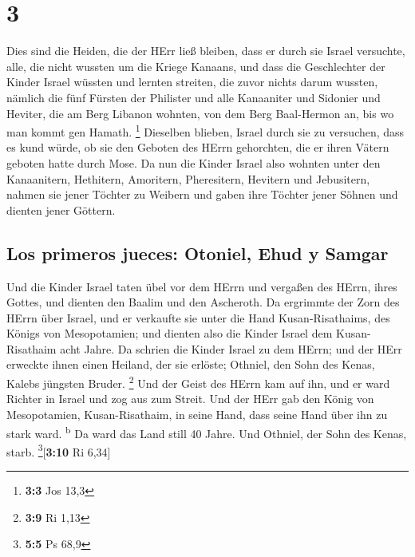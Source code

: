\hypertarget{section-2}{%
\section{3}\label{section-2}}

 Dies sind die Heiden, die der HErr ließ bleiben, dass er
durch sie Israel versuchte, alle, die nicht wussten um die Kriege
Kanaans,  und dass die Geschlechter der Kinder Israel
wüssten und lernten streiten, die zuvor nichts darum wussten,
 nämlich die fünf Fürsten der Philister und alle
Kanaaniter und Sidonier und Heviter, die am Berg Libanon wohnten, von
dem Berg Baal-Hermon an, bis wo man kommt gen Hamath. \footnote{\textbf{3:3}
  Jos 13,3}  Dieselben blieben, Israel durch sie zu
versuchen, dass es kund würde, ob sie den Geboten des HErrn gehorchten,
die er ihren Vätern geboten hatte durch Mose.  Da nun die
Kinder Israel also wohnten unter den Kanaanitern, Hethitern, Amoritern,
Pheresitern, Hevitern und Jebusitern,  nahmen sie jener
Töchter zu Weibern und gaben ihre Töchter jener Söhnen und dienten jener
Göttern.

\hypertarget{los-primeros-jueces-otoniel-ehud-y-samgar}{%
\subsection{Los primeros jueces: Otoniel, Ehud y
Samgar}\label{los-primeros-jueces-otoniel-ehud-y-samgar}}

 Und die Kinder Israel taten übel vor dem HErrn und
vergaßen des HErrn, ihres Gottes, und dienten den Baalim und den
Ascheroth.  Da ergrimmte der Zorn des HErrn über Israel,
und er verkaufte sie unter die Hand Kusan-Risathaims, des Königs von
Mesopotamien; und dienten also die Kinder Israel dem Kusan-Risathaim
acht Jahre.  Da schrien die Kinder Israel zu dem HErrn;
und der HErr erweckte ihnen einen Heiland, der sie erlöste; Othniel, den
Sohn des Kenas, Kalebs jüngsten Bruder. \footnote{\textbf{3:9} Ri 1,13}
 Und der Geist des HErrn kam auf ihn, und er ward Richter
in Israel und zog aus zum Streit. Und der HErr gab den König von
Mesopotamien, Kusan-Risathaim, in seine Hand, dass seine Hand über ihn
zu stark ward. \textsuperscript{b}  Da ward das Land
still 40 Jahre. Und Othniel, der Sohn des Kenas, starb.
\footnote{\textbf{5:5} Ps 68,9}{[}\textbf{3:10} Ri 6,34{]}

